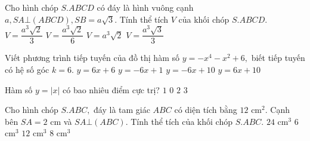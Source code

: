 \begin{ex}%
Cho hình chóp $ S.ABCD $ có đáy là hình vuông cạnh $ a, SA \bot \left(ABCD\right), SB = a \sqrt{3}. $ Tính thể tích $ V $ của khối chóp $ S.ABCD. $
	\choice
	{\True $ V = \dfrac{a^3 \sqrt{2}}{3} $}
	{$  V = \dfrac{a^3 \sqrt{2}}{6} $}
	{$ V = a^3 \sqrt{2}$}
	{$ V = \dfrac{a^3 \sqrt{3}}{3} $}
\end{ex}

\begin{ex}%
Viết phương trình tiếp tuyến của đồ thị hàm số $ y = -x^4 - x^2 + 6, $ biết tiếp tuyến có hệ số góc $ k = 6. $
	\choice
	{$ y = 6x + 6$}
	{$ y = -6x + 1$}
	{$ y = -6x + 10$}
	{\True $ y = 6x + 10$}
	
\end{ex}

\begin{ex}%
Hàm số $ y = \left| x \right|   $ có bao nhiêu điểm cực trị?
	\choice
	{\True $ 1$}
	{$ 0$}
	{$ 2$}
	{ $ 3$}
\end{ex}

\begin{ex}%
	Cho hình chóp $ S.ABC, $ đáy là tam giác $ ABC $ có diện tích bằng $ 12$ cm$^2$. Cạnh bên $ SA = 2 $ cm  và $ SA \bot \left(ABC\right) $. Tính thể tích của khối chóp $ S.ABC. $
	\choice
	{$ 24$ cm$^3 $}
	{$ 6$ cm$ ^3 $}
	{$ 12$ cm$ ^3 $}
	{\True $ 8$ cm$ ^3 $}
\end{ex}

